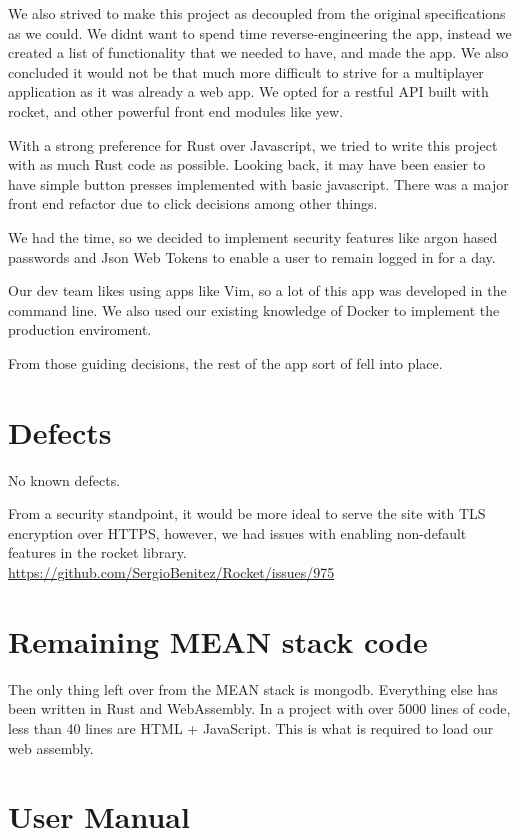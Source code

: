 \documentclass[letterpaper]{article}
\begin{document}
We also strived to make this project as decoupled from the original specifications as we could. We didnt want to spend time reverse-engineering the app, instead we created a list of functionality that we needed to have, and made the app. We also concluded it would not be that much more difficult to strive for a multiplayer application as it was already a web app. We opted for a restful API built with rocket, and other powerful front end modules like yew.

With a strong preference for Rust over Javascript, we tried to write this project with as much Rust code as possible. Looking back, it may have been easier to have simple button presses implemented with basic javascript. There was a major front end refactor due to click decisions among other things.

We had the time, so we decided to implement security features like argon hased passwords and Json Web Tokens to enable a user to remain logged in for a day.


Our dev team likes using apps like Vim, so a lot of this app was developed in the command line. We also used our existing knowledge of Docker to implement the production enviroment.


From those guiding decisions, the rest of the app sort of fell into place.

\section{Defects}
No known defects.

From a security standpoint, it would be more ideal to serve the site with TLS encryption over HTTPS,
however, we had issues with enabling non-default features in the rocket library.
\url{https://github.com/SergioBenitez/Rocket/issues/975}

\section{Remaining MEAN stack code}
The only thing left over from the MEAN stack is mongodb. Everything
else has been written in Rust and WebAssembly. In a project with over
5000 lines of code, less than 40 lines are HTML + JavaScript. This is
what is required to load our web assembly.


\section{User Manual}
\end{document}

